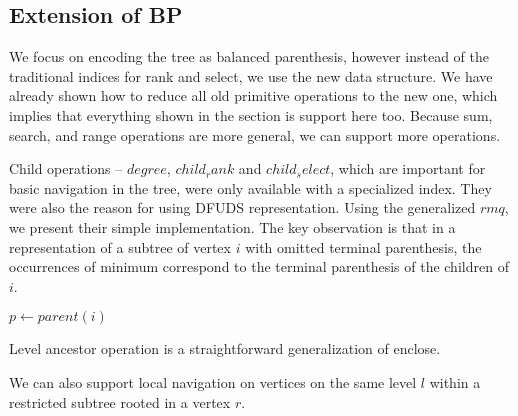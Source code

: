 \subsection{Extension of BP}

We focus on encoding the tree as balanced parenthesis, however instead of the traditional indices for rank and select, we use the new data structure.
We have already shown how to reduce all old primitive operations to the new one, which implies that everything shown in the section  is support here too.
Because sum, search, and range operations are more general, we can support more operations.

Child operations -- $degree$, $child_rank$ and $child_select$, which are important for basic navigation in the tree, were only available with a specialized index.
They were also the reason for using DFUDS representation.
Using the generalized $rmq$, we present their simple implementation.
The key observation is that in a representation of a subtree of vertex $i$ with omitted terminal parenthesis, the occurrences of minimum correspond to the terminal parenthesis of the children of $i$.

\begin{algorithmic}
	\State {}
\EndFunction
\end{algorithmic}

\begin{algorithmic}
	\State $p \gets parent(i)$
	\State {}
\EndFunction
\end{algorithmic}

\begin{algorithmic}
	\State {}
\EndFunction
\end{algorithmic}

Level ancestor operation is a straightforward generalization of enclose.

\begin{algorithmic}
	\State {}
\EndFunction
\end{algorithmic}

We can also support local navigation on vertices on the same level $l$ within a restricted subtree rooted in a vertex $r$.

\begin{algorithmic}
	\State {}
\EndFunction
\end{algorithmic}

